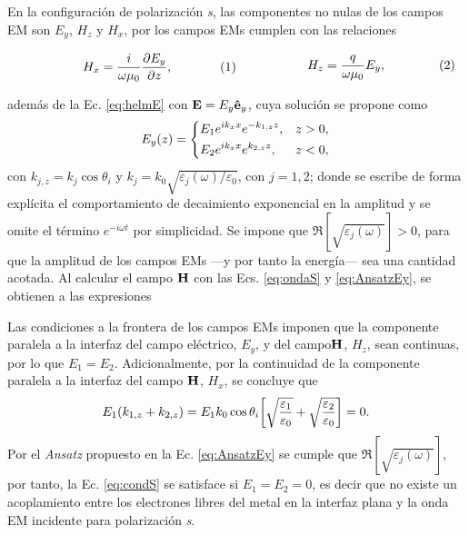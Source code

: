 En la configuración de polarización \emph{s}, las componentes no nulas de los campos EM son $E_y$, $H_z$ y $H_x$, por los campos EMs cumplen con las relaciones

	\begin{subequations}
	\eqhalf{	H_x =  \frac{i}{\omega \mu_0} \pdv{E_y}{z},\label{eq:Hx}}
	\eqhalf{H_z =  \frac{q}{\omega \mu_0} E_y, \label{eq:Hz}}	
	\label{eq:ondaS}	\end{subequations} 

\noindent además de la Ec. \eqref{eq:helmE} con $\vb{E} = E_y\vu{e}_y$, cuya solución se propone como
	\begin{align}
	E_y(z) = \begin{dcases}
		E_1 e^{ik_x x} e^{-k_{1,z}z}, & z>0,\\
		E_2 e^{ik_x x} e^{k_{2,z} z}, & z<0,
		\end{dcases}\label{eq:AnsatzEy}
	\end{align}
con $k_{j,z} = k_j\cos\theta_i$ y $k_j = k_0 \sqrt{\varepsilon_j(\omega)/\varepsilon_0}$, con $j = 1,2$; donde se escribe de forma explícita el comportamiento de decaimiento exponencial en la amplitud y se omite el término $e^{-i\omega t}$ por simplicidad. Se impone que $\Re[\sqrt{\varepsilon_j(\omega)}] >0$, para que la amplitud de los campos EMs ---y por tanto la energía--- sea una cantidad acotada. Al calcular el campo $\vb{H}$ con las Ecs. \eqref{eq:ondaS} y \eqref{eq:AnsatzEy}, se obtienen a las expresiones 
	
	
\noindent   Las condiciones a la frontera de los campos EMs imponen que la componente paralela a la interfaz del campo eléctrico, $E_y$, y del campo$\vb{H}$, $H_z$, sean continuas, por lo que $E_1 = E_2$. Adicionalmente, por la continuidad de la componente paralela a la interfaz del  campo $\vb{H}$, $H_x$, se concluye que
	\begin{align}
	E_1\qty(k_{1,z}+k_{2,z})= E_1 k_0\cos\theta_i \qty[\sqrt{\frac{\varepsilon_1}{\varepsilon_0}} + \sqrt{\frac{\varepsilon_2}{\varepsilon_0}}] = 0. \label{eq:condS}
	\end{align}
Por el \emph{Ansatz} propuesto en la Ec. \eqref{eq:AnsatzEy} se cumple que $\Re[\sqrt{\varepsilon_j(\omega)}]$, por tanto, la Ec. \eqref{eq:condS} se satisface si $E_1 = E_2 = 0$, es decir  que no existe un acoplamiento entre los electrones libres del metal en la interfaz plana y la onda EM incidente para polarización \emph{s}.

